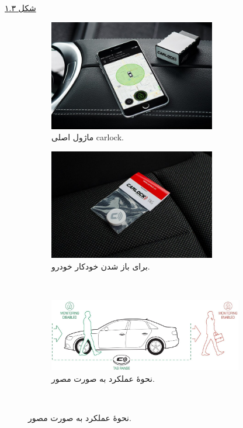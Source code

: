 \documentclass[a4paper,12pt]{report}
\begin{document}
	\hyperref[subfig2:fig2:subsec3:sec3:chap1]{شکل 	۱.۳}
	\begin{figure}[!h]
		\centering
		\footnotesize
		\begin{subfigure}[t]{0.3\linewidth}
			\centering
			\includegraphics[width=0.8\textwidth]{images/carlock-main-module.jpeg}
			\caption{
				ماژول اصلی
				carlock.
			}
			\label{subfig1:fig1:subsec3:sec3:chap1}
		\end{subfigure}
		\hspace*{1cm}
		\begin{subfigure}[t]{0.3\linewidth}
			\centering
			\includegraphics[width=0.8\textwidth]{images/carlock-tag.jpeg}
			\caption{
			برای باز شدن خودکار خودرو.
			}
			\label{subfig2:fig1:subsec3:sec3:chap1}
		\end{subfigure}\\
		\begin{subfigure}[t]{0.8\linewidth}
			\centering
			\includegraphics[width=0.93\textwidth]{images/carlock-tag-functionality.jpg}
			\caption{
				نحوهٔ عملکرد
				به صورت مصور.
			}
			\label{subfig1:fig2:subsec3:sec3:chap1}
		\end{subfigure}\\\vspace*{5mm}


\end{figure}
\end{document}
